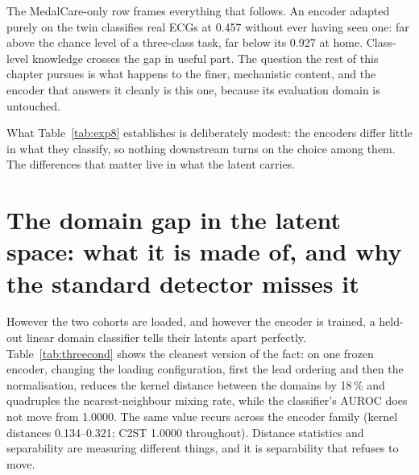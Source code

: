 The MedalCare-only row frames everything that follows. An encoder adapted purely on the twin classifies real ECGs at 0.457 without ever having seen one: far above the chance level of a three-class task, far below its 0.927 at home. Class-level knowledge crosses the gap in useful part. The question the rest of this chapter pursues is what happens to the finer, mechanistic content, and the encoder that answers it cleanly is this one, because its evaluation domain is untouched. 

What Table~\ref{tab:exp8} establishes is deliberately modest: the encoders differ little in what they classify, so nothing downstream turns on the choice among them. The differences that matter live in what the latent carries. 

\section[The domain gap in the latent space]{The domain gap in the latent space: what it is made of, and why the standard detector misses it}
\label{sec:res-align}

However the two cohorts are loaded, and however the encoder is trained, a held-out linear domain classifier tells their latents apart perfectly. Table~\ref{tab:threecond} shows the cleanest version of the fact: on one frozen encoder, changing the loading configuration, first the lead ordering and then the normalisation, reduces the kernel distance between the domains by 18\,\% and quadruples the nearest-neighbour mixing rate, while the classifier's AUROC does not move from 1.0000. The same value recurs across the encoder family (kernel distances 0.134--0.321; C2ST 1.0000 throughout). Distance statistics and separability are measuring different things, and it is separability that refuses to move. 

